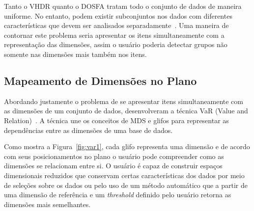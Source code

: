 Tanto o VHDR quanto o DOSFA tratam todo o conjunto de dados de maneira uniforme. No entanto, podem existir subconjuntos nos dados com diferentes características que devem ser analisados separadamente~\cite{May2011}. Uma maneira de contornar este problema seria apresentar os itens simultaneamente com a representação das dimensões, assim o usuário poderia detectar grupos não somente nas dimensões mais também nos itens.

\subsection{Mapeamento de Dimensões no Plano}

Abordando justamente o problema de se apresentar itens simultaneamente com as dimensões de um conjunto de dados, \citeauthor{Yang2004} desenvolveram a técnica VaR (Value and Relation)~\cite{Yang2004}. A técnica une os conceitos de MDS e glifos para representar as dependências entre as dimensões de uma base de dados. 

Como mostra a Figura~\ref{fig:var1}, cada glifo representa uma dimensão e de acordo com seus posicionamentos no plano o usuário pode compreender como as dimensões se relacionam entre si. 
O usuário é capaz de construir espaços dimensionais reduzidos que conservam certas características dos dados por meio de seleções sobre os dados ou pelo uso de um método automático que a partir de uma dimensão de referência e um \emph{threshold} definido pelo usuário retorna as dimensões mais semelhantes.

